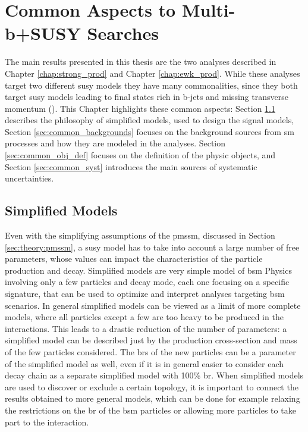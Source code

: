 \chapter{Common Aspects to Multi-b+\met SUSY Searches}
\label{chap:multib_general}

The main results presented in this thesis are the two analyses described in Chapter \ref{chap:strong_prod} and Chapter \ref{chap:ewk_prod}. While these analyses target two different \gls{susy} models they have many commonalities, since they both target \gls{susy} models leading to final states rich in b-jets and missing transverse momentum (\met). This Chapter highlights these common aspects: Section \ref{sec:simplified_models} describes the philosophy of simplified models, used to design the signal models, Section \ref{sec:common_backgrounds} focuses on the background sources from \gls{sm} processes and how they are modeled in the analyses. 
Section \ref{sec:common_obj_def} focuses on the definition of the physic objects, and Section \ref{sec:common_syst} introduces the main sources of 
systematic uncertainties.

\section{Simplified Models}
\label{sec:simplified_models}

Even with the simplifying assumptions of the \gls{pmssm}, discussed in Section \ref{sec:theory:pmssm}, a \gls{susy} model has to take into account a large number of free parameters, whose values can impact the characteristics of the particle production and decay. 
Simplified models \cite{Alves:2011wf} are very simple model of \gls{bsm} Physics involving only a few particles and decay mode, 
each one focusing on a specific signature, that can be used to optimize and interpret analyses targeting \gls{bsm} scenarios. 
In general simplified models can be viewed as a limit of more complete models, where all particles except a few are too heavy to be 
produced in the interactions. This leads to a drastic reduction of the number of parameters: a simplified model can be described just by the production cross-section and mass of the few particles considered. 
The \glspl{br} of the new particles can be a parameter of the simplified model as well, even if it is in general easier to consider each decay chain as a separate simplified model with 100\% \gls{br}.
When simplified models are used to discover or exclude a certain topology, it is important to connect the results obtained to more general models, 
which can be done for example relaxing the restrictions on the \gls{br} of the \gls{bsm} particles or allowing more particles to take part to the interaction.

